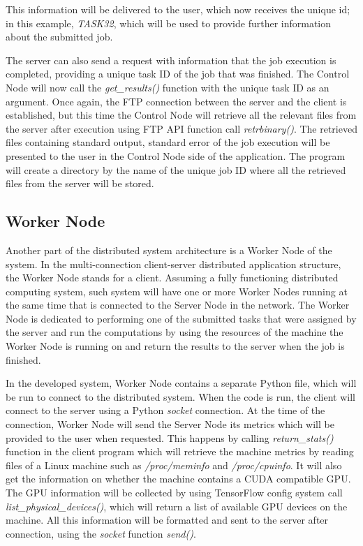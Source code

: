 \documentclass[10pt]{report}
\begin{document}
This information will be delivered to the user, which now receives the unique id; in this example, \textit{TASK32}, which will be used to provide further information about the submitted job.
\newline

The server can also send a request with information that the job execution is completed, providing a unique task ID of the job that was finished. The Control Node will now call the \textit{get\_results()} function with the unique task ID as an argument. Once again, the FTP connection between the server and the client is established, but this time the Control Node will retrieve all the relevant files from the server after execution using FTP API function call \textit{retrbinary()}. The retrieved files containing standard output, standard error of the job execution will be presented to the user in the Control Node side of the application. The program will create a directory by the name of the unique job ID where all the retrieved files from the server will be stored.

\subsection{Worker Node}

Another part of the distributed system architecture is a Worker Node of the system. In the multi-connection client-server distributed application structure, the Worker Node stands for a client. Assuming a fully functioning distributed computing system, such system will have one or more Worker Nodes running at the same time that is connected to the Server Node in the network. The Worker Node is dedicated to performing one of the submitted tasks that were assigned by the server and run the computations by using the resources of the machine the Worker Node is running on and return the results to the server when the job is finished.
\newline

In the developed system, Worker Node contains a separate Python file, which will be run to connect to the distributed system. When the code is run, the client will connect to the server using a Python \textit{socket} connection. At the time of the connection, Worker Node will send the Server Node its metrics which will be provided to the user when requested. This happens by calling \textit{return\_stats()} function in the client program which will retrieve the machine metrics by reading files of a Linux machine such as \textit{/proc/meminfo} and \textit{/proc/cpuinfo}. It will also get the information on whether the machine contains a CUDA compatible GPU. The GPU information will be collected by using TensorFlow config system call \textit{list\_physical\_devices()}, which will return a list of available GPU devices on the machine. All this information will be formatted and sent to the server after connection, using the \textit{socket} function \textit{send()}.
\newline
\end{document}
